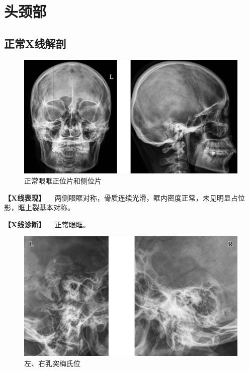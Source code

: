 \chapter{头颈部}

\section{正常X线解剖}

\begin{figure}[!htbp]
 \centering
 \includegraphics{./images/Image00411.jpg}
 \captionsetup{justification=centering}
 \caption{正常眼眶正位片和侧位片}
 \label{fig7-1-1}
  \end{figure} 

\textbf{【X线表现】}
　两侧眼眶对称，骨质连续光滑，眶内密度正常，未见明显占位影，眶上裂基本对称。

\textbf{【X线诊断】} 　正常眼眶。

\begin{figure}[!htbp]
 \centering
 \includegraphics{./images/Image00412.jpg}
 \captionsetup{justification=centering}
 \caption{左、右乳突梅氏位}
 \label{fig7-1-2}
  \end{figure} 

